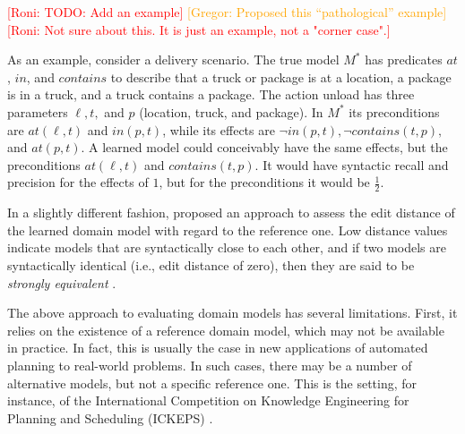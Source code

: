 \documentclass{article}
\theoremstyle{definition}
\theoremstyle{remark}
\newcommand{\realm}{\ensuremath{M^*}\xspace}
\newcommand{\roni}[1]{{\textcolor{red}{[Roni: #1]}}}
\newcommand{\mauro}[1]{{\textcolor{green}{[Mauro: #1]}}}
\newcommand{\gregor}[1]{{\textcolor{orange}{[Gregor: #1]}}}
\begin{document}
\roni{TODO: Add an example}
\gregor{Proposed this ``pathological'' example}
\roni{Not sure about this. It is just an example, not a "corner case".}

As an example, consider a delivery scenario.
The true model $\realm$ has predicates $at$, $in$, and $contains$ to describe that a truck or package is at a location, a package is in a truck, and a truck contains a package.
The action unload has three parameters $\ell, t,$ and $p$ (location, truck, and package).
In $\realm$ its preconditions are $at(\ell, t)$ and $in(p,t)$, while its effects are $\neg in(p,t), \neg contains(t,p),$ and $at(p,t)$.
A learned model could conceivably have the same effects, but the preconditions $at(\ell, t)$ and $contains(t,p)$.
It would have syntactic recall and precision for the effects of $1$, but for the preconditions it would be $\frac 1 2$.



In a slightly different fashion, \cite{chrpa2023comparing} proposed an approach to assess the edit distance of the learned domain model with regard to the reference one. Low distance values indicate models that are syntactically close to each other, and if two models are syntactically identical (i.e., edit distance of zero), then they are said to be \textit{strongly equivalent} \citep{chrpa2023comparing}.



The above approach to evaluating domain models has several limitations. 
First, it relies on the existence of a reference domain model, which may not be available in practice. 
In fact, this is usually the case in new applications of automated planning to real-world problems. In such cases, there may be a number of alternative models, but not a specific reference one. This is the setting, for instance, of the International Competition on Knowledge Engineering for Planning and Scheduling (ICKEPS) \citep{DBLP:journals/aim/ChrpaMVV17}.
\end{document}
